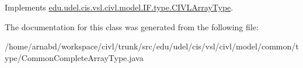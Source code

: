 Implements \hyperlink{interfaceedu_1_1udel_1_1cis_1_1vsl_1_1civl_1_1model_1_1IF_1_1type_1_1CIVLArrayType_a3588238496da827caf5b14b83c2e6eb6}{edu.\+udel.\+cis.\+vsl.\+civl.\+model.\+I\+F.\+type.\+C\+I\+V\+L\+Array\+Type}.



The documentation for this class was generated from the following file\+:\begin{DoxyCompactItemize}
\item 
/home/arnabd/workspace/civl/trunk/src/edu/udel/cis/vsl/civl/model/common/type/Common\+Complete\+Array\+Type.\+java\end{DoxyCompactItemize}
